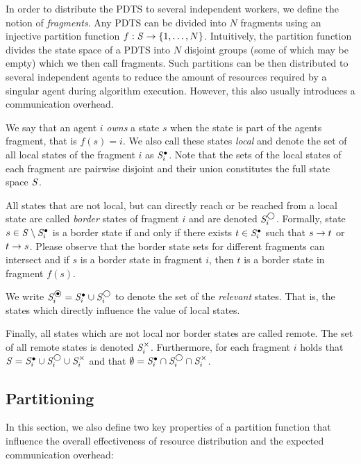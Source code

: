 In order to distribute the \ac{PDTS} to several independent workers, we define the notion of \emph{fragments}. Any \ac{PDTS} can be divided into $N$ fragments using an injective partition function $f: \mathit{S} \to \{1, \ldots, N \}$. Intuitively, the partition function divides the state space of a \ac{PDTS} into $N$ disjoint groups (some of which may be empty) which we then call fragments. Such partitions can be then distributed to several independent agents to reduce the amount of resources required by a singular agent during algorithm execution. However, this also usually introduces a communication overhead. 

We say that an agent $i$ \emph{owns} a state $s$ when the state is part of the agents fragment, that is $f(s) = i$. We also call these states \emph{local} and denote the set of all local states of the fragment $i$ as $\mathit{S}^\bullet_i$. Note that the sets of the local states of each fragment are pairwise disjoint and their union constitutes the full state space $\mathit{S}$. 

All states that are not local, but can directly reach or be reached from a local state are called \emph{border} states of fragment $i$ and are denoted $\mathit{S}^\bigcirc_i$. Formally, state $s \in \mathit{S} \setminus \mathit{S}^\bullet_i$ is a border state if and only if there exists $t \in \mathit{S}^\bullet_i$ such that $s \rightarrow t$ or $t \rightarrow s$. Please observe that the border state sets for different fragments can intersect and if $s$ is a border state in fragment $i$, then $t$ is a border state in fragment $f(s)$.

We write $\dtsSrelevant_i = \dtsSlocal_i \cup \dtsSborder_i$ to denote the set of the \emph{relevant} states. That is, the states which directly influence the value of local states.

Finally, all states which are not local nor border states are called remote. The set of all remote states is denoted $\mathit{S}^\times_i$. Furthermore, for each fragment $i$ holds that $\mathit{S} = \mathit{S}^\bullet_i \cup \mathit{S}^\bigcirc_i \cup \mathit{S}^\times_i$ and that $\emptyset = \mathit{S}^\bullet_i \cap \mathit{S}^\bigcirc_i \cap \mathit{S}^\times_i$.

\subsection{Partitioning}

In this section, we also define two key properties of a partition function that influence the overall effectiveness of resource distribution and the expected communication overhead:


